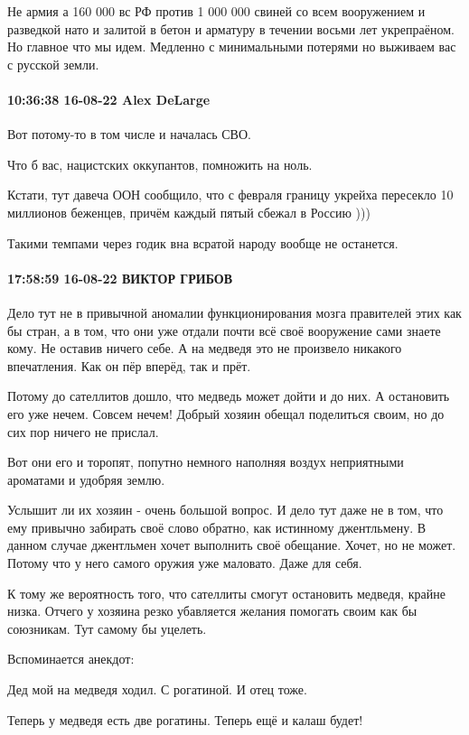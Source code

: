 Не армия а 160 000 вс РФ против 1 000 000 свиней со всем вооружением и
разведкой нато и залитой в бетон и арматуру в течении восьми лет укрепраёном.
Но главное что мы идем. Медленно с минимальными потерями но выживаем вас с
русской земли.

\paragraph{10:36:38 16-08-22 Alex DeLarge}

Вот потому-то в том числе и началась СВО.

Что б вас, нацистских оккупантов, помножить на ноль.

Кстати, тут давеча ООН сообщило, что с февраля границу укрейха пересекло 10
миллионов беженцев, причём каждый пятый сбежал в Россию )))

Такими темпами через годик вна всратой народу вообще не останется.

\paragraph{17:58:59 16-08-22 ВИКТОР ГРИБОВ}

Дело тут не в привычной аномалии функционирования мозга правителей этих как бы
стран, а в том, что они уже отдали почти всё своё вооружение сами знаете кому.
Не оставив ничего себе. А на медведя это не произвело никакого впечатления. Как
он пёр вперёд, так и прёт.

Потому до сателлитов дошло, что медведь может дойти и до них. А остановить его
уже нечем. Совсем нечем! Добрый хозяин обещал поделиться своим, но до сих пор
ничего не прислал.

Вот они его и торопят, попутно немного наполняя воздух неприятными ароматами и
удобряя землю.

Услышит ли их хозяин - очень большой вопрос. И дело тут даже не в том, что ему
привычно забирать своё слово обратно, как истинному джентльмену. В данном
случае джентльмен хочет выполнить своё обещание. Хочет, но не может. Потому что
у него самого оружия уже маловато. Даже для себя.

К тому же вероятность того, что сателлиты смогут остановить медведя, крайне
низка. Отчего у хозяина резко убавляется желания помогать своим как бы
союзникам. Тут самому бы уцелеть.

Вспоминается анекдот:

Дед мой на медведя ходил. С рогатиной. И отец тоже.

Теперь у медведя есть две рогатины. Теперь ещё и калаш будет!

